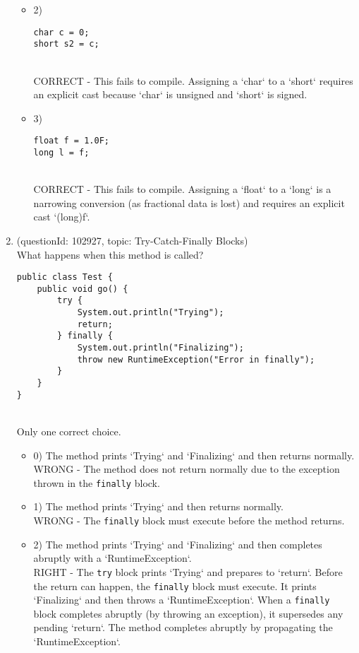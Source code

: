 \documentclass[12pt]{article}
\begin{document}
\begin{enumerate}[label=(\arabic*)]
\begin{itemize}
\item 2) \begin{verbatim}
char c = 0;
short s2 = c;
\end{verbatim}
 \\ 
CORRECT - This fails to compile. Assigning a `char` to a `short` requires an explicit cast because `char` is unsigned and `short` is signed.

\item 3) \begin{verbatim}
float f = 1.0F;
long l = f;
\end{verbatim}
 \\ 
CORRECT - This fails to compile. Assigning a `float` to a `long` is a narrowing conversion (as fractional data is lost) and requires an explicit cast `(long)f`.

\end{itemize}
\item (questionId: 102927, topic: Try-Catch-Finally Blocks) \\ 
What happens when this method is called?
\begin{verbatim}
public class Test {
    public void go() {
        try {
            System.out.println("Trying");
            return;
        } finally {
            System.out.println("Finalizing");
            throw new RuntimeException("Error in finally");
        }
    }
}
\end{verbatim}
\\ \noindent Only one correct choice. 
\begin{itemize}
\item 0) The method prints `Trying` and `Finalizing` and then returns normally.
 \\ 
WRONG - The method does not return normally due to the exception thrown in the \verb|finally| block.

\item 1) The method prints `Trying` and then returns normally.
 \\ 
WRONG - The \verb|finally| block must execute before the method returns.

\item 2) The method prints `Trying` and `Finalizing` and then completes abruptly with a `RuntimeException`.
 \\ 
RIGHT - The \verb|try| block prints `Trying` and prepares to `return`. Before the return can happen, the \verb|finally| block must execute. It prints `Finalizing` and then throws a `RuntimeException`. When a \verb|finally| block completes abruptly (by throwing an exception), it supersedes any pending `return`. The method completes abruptly by propagating the `RuntimeException`.


\end{itemize}
\end{enumerate}
\end{document}
